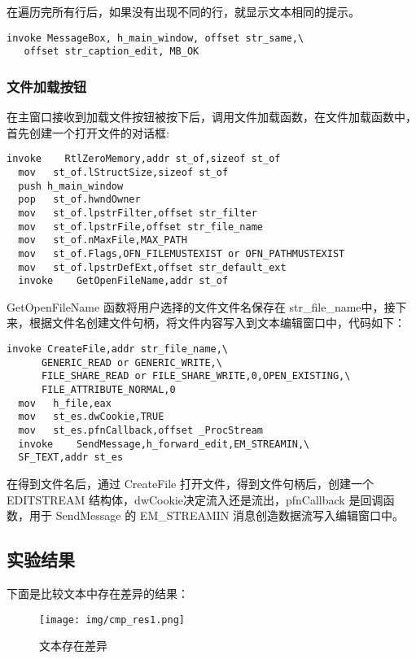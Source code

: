 \documentclass[proposal-report]{bitart}
\begin{document}
在遍历完所有行后，如果没有出现不同的行，就显示文本相同的提示。

\begin{lstlisting}[language={[x86masm]Assembler}]
  invoke MessageBox, h_main_window, offset str_same,\
   offset str_caption_edit, MB_OK
\end{lstlisting}

\subsubsection{文件加载按钮}

在主窗口接收到加载文件按钮被按下后，调用文件加载函数，在文件加载函数中，首先创建一个打开文件的对话框:

\begin{lstlisting}[language={[x86masm]Assembler}]
  invoke	RtlZeroMemory,addr st_of,sizeof st_of
  mov	st_of.lStructSize,sizeof st_of
  push h_main_window
  pop	st_of.hwndOwner
  mov	st_of.lpstrFilter,offset str_filter
  mov	st_of.lpstrFile,offset str_file_name
  mov	st_of.nMaxFile,MAX_PATH
  mov	st_of.Flags,OFN_FILEMUSTEXIST or OFN_PATHMUSTEXIST
  mov	st_of.lpstrDefExt,offset str_default_ext
  invoke	GetOpenFileName,addr st_of
\end{lstlisting}

GetOpenFileName 函数将用户选择的文件文件名保存在 str\_file\_name中，接下来，根据文件名创建文件句柄，将文件内容写入到文本编辑窗口中，代码如下：

\begin{lstlisting}[language={[x86masm]Assembler}]
  invoke CreateFile,addr str_file_name,\
      GENERIC_READ or GENERIC_WRITE,\
      FILE_SHARE_READ or FILE_SHARE_WRITE,0,OPEN_EXISTING,\
      FILE_ATTRIBUTE_NORMAL,0
  mov	h_file,eax
  mov	st_es.dwCookie,TRUE
  mov	st_es.pfnCallback,offset _ProcStream
  invoke	SendMessage,h_forward_edit,EM_STREAMIN,\
  SF_TEXT,addr st_es
\end{lstlisting}

在得到文件名后，通过 CreateFile 打开文件，得到文件句柄后，创建一个 EDITSTREAM 结构体，dwCookie决定流入还是流出，pfnCallback 是回调函数，用于 SendMessage 的 EM\_STREAMIN 消息创造数据流写入编辑窗口中。

\subsection{实验结果}

下面是比较文本中存在差异的结果：

\begin{figure}[H]
  \centering
  \texttt{[image: img/cmp\_res1.png]}
  \caption{文本存在差异}
\end{figure}
\end{document}
